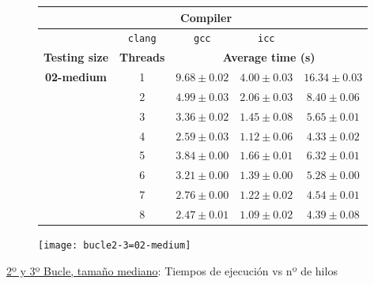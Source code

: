 \begin{figure}[H]
    \centering
    \begin{subfigure}{0.4\textwidth}
        \begin{adjustbox}{width=\textwidth} 
        \begin{tabular}{|c|c|c|c|c|}
            \hline
            \rowcolor{azul} \multicolumn{2}{|c|}{}&\multicolumn{3}{c|}{\textbf{Compiler}} \\ \hline
            \rowcolor{azul} \multicolumn{2}{|c|}{}&\texttt{clang}&\texttt{gcc}&\texttt{icc}\\ \hline
            \rowcolor{azul} \textbf{Testing size} & \textbf{Threads}&\multicolumn{3}{c|}{\textbf{Average time (s)}} \\ \hline
            \multirow{8}{2.5cm}{\textbf{02-medium}} & 1 & \(9.68\pm{0.02}\) & \(4.00\pm{0.03}\) & \(16.34\pm{0.03}\) \\ \cline{2-5}
            & 2 & \(4.99\pm{0.03}\) & \(2.06\pm{0.03}\) & \(8.40\pm{0.06}\) \\ \cline{2-5}
            & 3 & \(3.36\pm{0.02}\) & \(1.45\pm{0.08}\) & \(5.65\pm{0.01}\) \\ \cline{2-5}
            & 4 & \(2.59\pm{0.03}\) & \(1.12\pm{0.06}\) & \(4.33\pm{0.02}\) \\ \cline{2-5}
            & 5 & \(3.84\pm{0.00}\) & \(1.66\pm{0.01}\) & \(6.32\pm{0.01}\) \\ \cline{2-5}
            & 6 & \(3.21\pm{0.00}\) & \(1.39\pm{0.00}\) & \(5.28\pm{0.00}\) \\ \cline{2-5}
            & 7 & \(2.76\pm{0.00}\) & \(1.22\pm{0.02}\) & \(4.54\pm{0.01}\) \\ \cline{2-5}
            & 8 & \(2.47\pm{0.01}\) & \(1.09\pm{0.02}\) & \(4.39\pm{0.08}\) \\ \hline
        \end{tabular}
        \end{adjustbox}
    \end{subfigure}
    \hfill
    \begin{subfigure}{0.5\textwidth}
        \texttt{[image: bucle2-3=02-medium]}
    \end{subfigure}
    \caption{\underline{2º y 3º Bucle, tamaño mediano}: Tiempos de ejecución vs nº de hilos}
    \label{bucle2-3=02-medium}
\end{figure}


